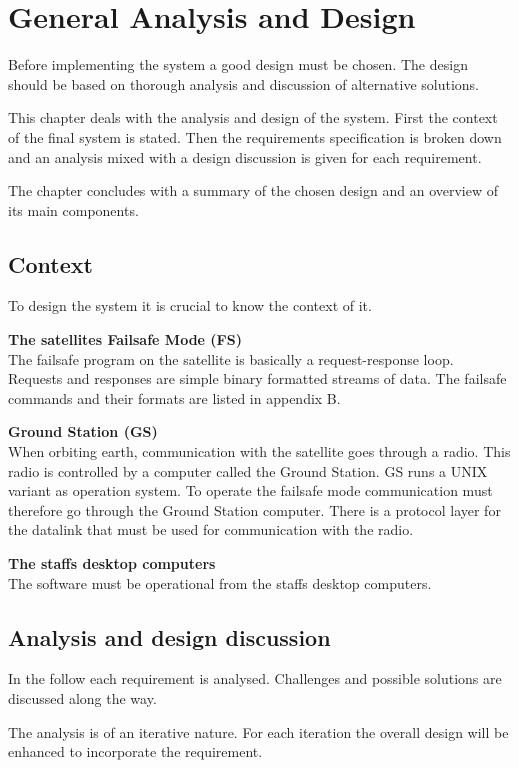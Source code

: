\chapter{General Analysis and Design}
\label{chap:general_analysis}
Before implementing the system a good design must be chosen. The design should be based on thorough analysis and discussion of alternative solutions.

This chapter deals with the analysis and design of the system. First the context of the final system is stated. Then the requirements specification is broken down and an analysis mixed with a design discussion is given for each requirement.

The chapter concludes with a summary of the chosen design and an overview of its main components.

\section{Context}
To design the system it is crucial to know the context of it.

\textbf{The satellites Failsafe Mode (FS)} \\
The failsafe program on the satellite is basically a request-response loop. Requests and responses are simple binary formatted streams of data. The failsafe commands and their formats are listed in appendix B.

\textbf{Ground Station (GS)} \\
When orbiting earth, communication with the satellite goes through a radio. This radio is controlled by a computer called the Ground Station. GS runs a UNIX variant as operation system. To operate the failsafe mode communication must therefore go through the Ground Station computer.
There is a protocol layer for the datalink that must be used for communication with the radio.

\textbf{The staffs desktop computers} \\
The software must be operational from the staffs desktop computers.

\section{Analysis and design discussion}
In the follow each requirement is analysed. Challenges and possible solutions are discussed along the way.

The analysis is of an iterative nature. For each iteration the overall design will be enhanced to incorporate the requirement.

